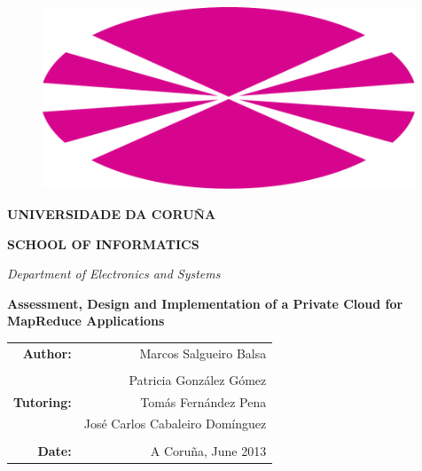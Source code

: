\begin{titlepage}
\begin{changemargin}{-2.8cm}{0cm}
\begin{center}

\begin{figure}[tbp]
\hspace*{-1.5cm}
\includegraphics[width=0.99\textwidth]{imagenes/00.pdf}
\end{figure}

{\Large \bf{UNIVERSIDADE DA CORU\~NA}}

{\large \bf{SCHOOL OF INFORMATICS}}

\vspace{0.25cm}

\emph{Department of Electronics and Systems}

\vspace{1.25cm}



{\huge \bf{Assessment, Design and Implementation of a Private Cloud for MapReduce Applications}}

\vspace{1.5cm}

\begin{flushright}
\begin{tabular}{r r@{}}
\textbf{Author:} & Marcos Salgueiro Balsa \\
& \\
& Patricia Gonz\'alez G\'omez \\
\textbf{Tutoring:} & Tom\'as Fern\'andez Pena \\
& Jos\'e Carlos Cabaleiro Dom\'inguez \\
& \\
\textbf{Date:} & A Coru\~na, June 2013
\end{tabular}
\end{flushright}

\end{center}
\end{changemargin}
\end{titlepage}
